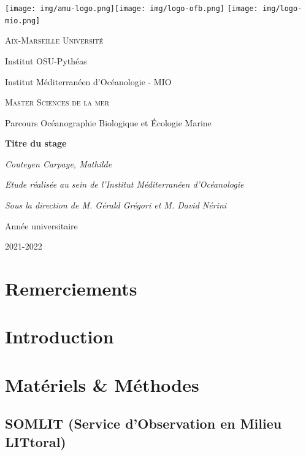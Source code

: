 \documentclass[12pt]{article}
\newcommand\myemptypage{
    \null
    \thispagestyle{empty}
    \addtocounter{page}{-1}
    \newpage
    }
\begin{document}
\begin{titlepage}
\centering
\texttt{[image: img/amu-logo.png]}\hfill  \texttt{[image: img/logo-ofb.png]} \hfill \texttt{[image: img/logo-mio.png]}\par\vspace{1cm}
{\scshape\large Aix-Marseille Université\par}
{\large Institut OSU-Pythéas\par}
Institut Méditerranéen d’Océanologie - MIO \par
\vspace{2cm}
{\scshape\large Master Sciences de la mer\par}
{\large Parcours Océanographie Biologique et Écologie Marine\par}
\vspace{2cm}
{\LARGE \bfseries Titre du stage\par}
\vspace{.5cm}
{\large \itshape Couteyen Carpaye, Mathilde\par}
\vfill
{\itshape Etude réalisée au sein de l'Institut Méditerranéen d'Océanologie\par}
{\itshape Sous la direction de M. Gérald Grégori et M. David Nérini\par }
\vfill
Année universitaire\par
2021-2022
\end{titlepage}

\myemptypage

\section*{Remerciements}


\newpage


\newpage
\tableofcontents
\newpage


\section{Introduction}


\section{Matériels \& Méthodes}

\subsection{SOMLIT (Service d'Observation en Milieu LITtoral)}
\end{document}
